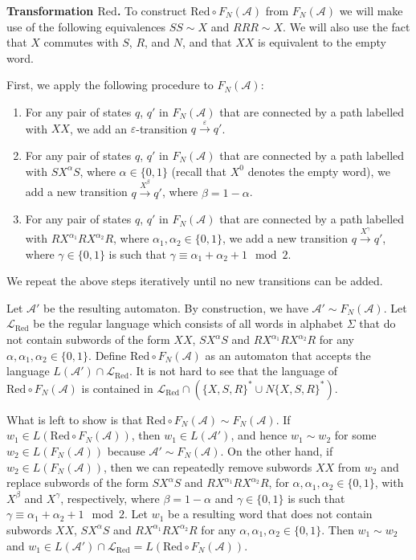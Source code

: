 \documentclass[fontsize=11pt,DIV=13,paper=letter]{scrartcl}
\theoremstyle{definition}
\newcommand{\A}{\mathcal{A}}
\newcommand{\LL}{\mathcal{L}}
\renewcommand{\epsilon}{\varepsilon}
\begin{document}
{\bf Transformation $\mathrm{Red}$.} To construct $\mathrm{Red}\circ F_N(\A)$ from $F_N(\A)$ we will make use of the following equivalences $SS\sim X$ and $RRR\sim X$. We will also use the fact that $X$ commutes with $S$, $R$, and $N$, and that $\mathit{XX}$ is equivalent to the empty word.

First, we apply the following procedure to $F_N(\A)$:
\begin{enumerate}[(1)]
\item For any pair of states $q$, $q'$ in $F_N(\A)$ that are connected by a path labelled with $\mathit{XX}$, we add an $\epsilon$-transition $q\xrightarrow{\epsilon} q'$.

\item For any pair of states $q$, $q'$ in $F_N(\A)$ that are connected by a path labelled with $SX^\alpha S$, where $\alpha\in \{0,1\}$ (recall that $X^0$ denotes the empty word), we add a new transition $q\xrightarrow{X^\beta} q'$, where $\beta=1-\alpha$.

\item For any pair of states $q$, $q'$ in $F_N(\A)$ that are connected by a path labelled with $RX^{\alpha_1}RX^{\alpha_2}R$, where $\alpha_1, \alpha_2\in \{0,1\}$, we add a new transition $q\xrightarrow{X^\gamma} q'$, where $\gamma \in \{0,1\}$ is such that $\gamma \equiv \alpha_1+\alpha_2+1 \mod 2$.
\end{enumerate}
We repeat the above steps iteratively until no new transitions can be added.

Let $\A'$ be the resulting automaton. By construction, we have $\A'\sim F_N(\A)$. Let $\LL_\mathrm{Red}$ be the regular language which consists of all words in alphabet $\Sigma$ that do not contain subwords of the form $\mathit{XX}$, $SX^\alpha S$ and $RX^{\alpha_1}RX^{\alpha_2}R$ for any $\alpha,\alpha_1,\alpha_2\in \{0,1\}$. Define $\mathrm{Red}\circ F_N(\A)$ as an automaton that accepts the language $L(\A')\cap \LL_\mathrm{Red}$. It is not hard to see that the language of $\mathrm{Red}\circ F_N(\A)$ is contained in $\LL_\mathrm{Red}\cap ({\{X,S,R\}}^*\cup N{\{X,S,R\}}^*)$.

What is left to show is that $\mathrm{Red}\circ F_N(\A)\sim F_N(\A)$. If $w_1\in L(\mathrm{Red}\circ F_N(\A))$, then $w_1\in L(\A')$, and hence $w_1\sim w_2$ for some $w_2\in L(F_N(\A))$ because $\A'\sim F_N(\A)$. On the other hand, if $w_2\in L(F_N(\A))$, then we can repeatedly remove subwords $\mathit{XX}$ from $w_2$ and replace subwords of the form $SX^\alpha S$ and $RX^{\alpha_1}RX^{\alpha_2}R$, for $\alpha,\alpha_1,\alpha_2\in \{0,1\}$, with $X^\beta$ and $X^\gamma$, respectively, where $\beta=1-\alpha$ and $\gamma \in \{0,1\}$ is such that $\gamma \equiv \alpha_1+\alpha_2+1 \mod 2$. Let $w_1$ be a resulting word that does not contain subwords $\mathit{XX}$, $SX^\alpha S$ and $RX^{\alpha_1}RX^{\alpha_2}R$ for any $\alpha,\alpha_1,\alpha_2\in \{0,1\}$. Then $w_1\sim w_2$ and $w_1\in L(\A')\cap \LL_\mathrm{Red}=L(\mathrm{Red}\circ F_N(\A))$.
\end{document}
